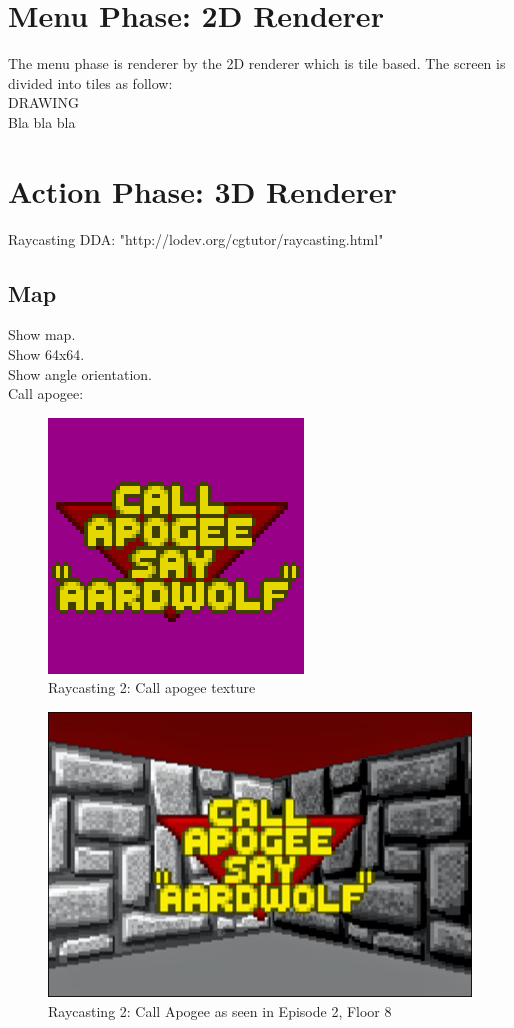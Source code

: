 \documentclass[book.tex]{subfiles}
\begin{document}
\section{Menu Phase: 2D Renderer}
The menu phase is renderer by the 2D renderer which is tile based. The screen is divided into tiles as follow:\\
DRAWING\\
Bla bla bla\\

\section{Action Phase: 3D Renderer}

Raycasting DDA: "http://lodev.org/cgtutor/raycasting.html"

\subsection{Map}
Show map.\\
Show 64x64.\\
Show angle orientation.\\

Call apogee:\\
\begin{figure}[H]
  \centering
 \includegraphics[scale=1.3]{imgs/call_apogee_texture.png}
 \caption{Raycasting 2: Call apogee texture} \label{fig:callapogeesprite}
\end{figure}

\begin{figure}[H]
  \centering
 \includegraphics[scale=0.6]{imgs/call_apogee.png}
 \caption{Raycasting 2: Call Apogee as seen in  Episode 2, Floor 8} \label{fig:callapogeeingame}
\end{figure}
\end{document}
